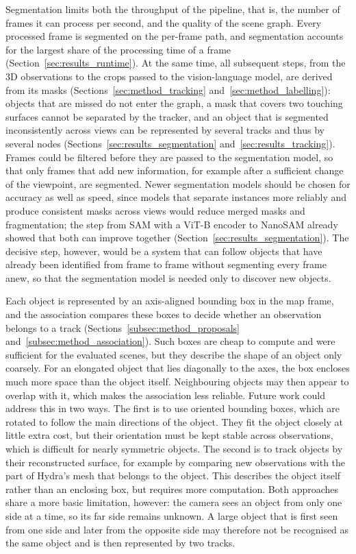 {\small Segmentation limits both the throughput of the pipeline, that is, the number of frames it can process per second, and the quality of the scene graph. Every processed frame is segmented on the per-frame path, and segmentation accounts for the largest share of the processing time of a frame (Section~\ref{sec:results_runtime}). At the same time, all subsequent steps, from the 3D observations to the crops passed to the vision-language model, are derived from its masks (Sections~\ref{sec:method_tracking} and~\ref{sec:method_labelling}): objects that are missed do not enter the graph, a mask that covers two touching surfaces cannot be separated by the tracker, and an object that is segmented inconsistently across views can be represented by several tracks and thus by several nodes (Sections~\ref{sec:results_segmentation} and~\ref{sec:results_tracking}). Frames could be filtered before they are passed to the segmentation model, so that only frames that add new information, for example after a sufficient change of the viewpoint, are segmented. Newer segmentation models should be chosen for accuracy as well as speed, since models that separate instances more reliably and produce consistent masks across views would reduce merged masks and fragmentation; the step from SAM with a ViT-B encoder to NanoSAM already showed that both can improve together (Section~\ref{sec:results_segmentation}). The decisive step, however, would be a system that can follow objects that have already been identified from frame to frame without segmenting every frame anew, so that the segmentation model is needed only to discover new objects.\par}

{\small Each object is represented by an axis-aligned bounding box in the map frame, and the association compares these boxes to decide whether an observation belongs to a track (Sections~\ref{subsec:method_proposals} and~\ref{subsec:method_association}). Such boxes are cheap to compute and were sufficient for the evaluated scenes, but they describe the shape of an object only coarsely. For an elongated object that lies diagonally to the axes, the box encloses much more space than the object itself. Neighbouring objects may then appear to overlap with it, which makes the association less reliable. Future work could address this in two ways. The first is to use oriented bounding boxes, which are rotated to follow the main directions of the object. They fit the object closely at little extra cost, but their orientation must be kept stable across observations, which is difficult for nearly symmetric objects. The second is to track objects by their reconstructed surface, for example by comparing new observations with the part of Hydra's mesh that belongs to the object. This describes the object itself rather than an enclosing box, but requires more computation. Both approaches share a more basic limitation, however: the camera sees an object from only one side at a time, so its far side remains unknown. A large object that is first seen from one side and later from the opposite side may therefore not be recognised as the same object and is then represented by two tracks.\par}

